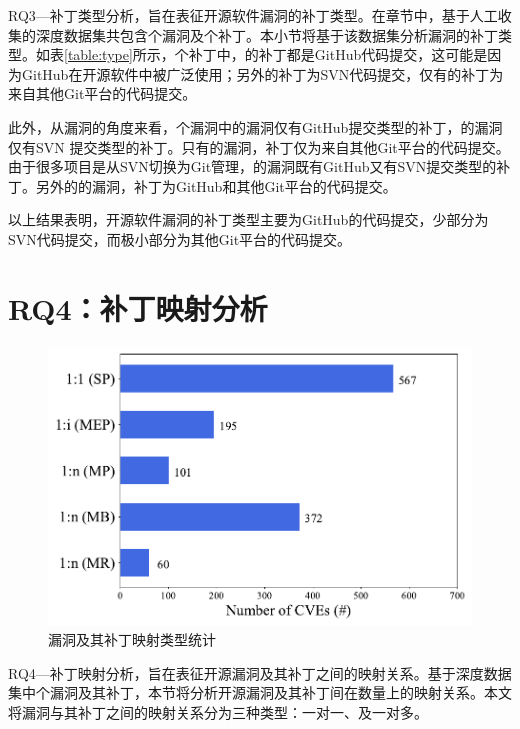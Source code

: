 RQ3---补丁类型分析，旨在表征开源软件漏洞的补丁类型。在章节\tocheck{\ref{sec:preparation}}中，基于人工收集的深度数据集共包含个漏洞及个补丁。本小节将基于该数据集分析漏洞的补丁类型。如表\ref{table:type}所示，个补丁中，的补丁都是GitHub代码提交，这可能是因为GitHub在开源软件中被广泛使用；另外的补丁为SVN代码提交，仅有的补丁为来自其他Git平台的代码提交。

此外，从漏洞的角度来看，个漏洞中的漏洞仅有GitHub提交类型的补丁，的漏洞仅有SVN 提交类型的补丁。只有的漏洞，补丁仅为来自其他Git平台的代码提交。由于很多项目是从SVN切换为Git管理，的漏洞既有GitHub又有SVN提交类型的补丁。另外的的漏洞，补丁为GitHub和其他Git平台的代码提交。

以上结果表明，开源软件漏洞的补丁类型主要为GitHub的代码提交，少部分为SVN代码提交，而极小部分为其他Git平台的代码提交。

\section{RQ4：补丁映射分析}\label{sec:cardinality}
\begin{figure}[h]
\centering
\includegraphics[scale=0.68]{fig/rq4-cardinality.pdf}
\vspace{-10pt}
\caption{漏洞及其补丁映射类型统计}\label{fig:rq4-cardinality}
\end{figure}

RQ4---补丁映射分析，旨在表征开源漏洞及其补丁之间的映射关系。基于深度数据集中个漏洞及其补丁，本节将分析开源漏洞及其补丁间在数量上的映射关系。本文将漏洞与其补丁之间的映射关系分为三种类型：一对一、及一对多。

